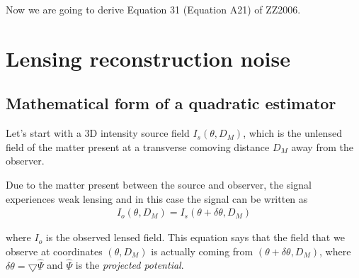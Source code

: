 \documentclass[12pt]{article}
\newcommand{\beqa}{\begin{eqnarray}}
\newcommand{\eeqa}{\end{eqnarray}}
\numberwithin{equation}{section}
\begin{document}
Now we are going to derive Equation 31 (Equation A21) of ZZ2006.

\section{Lensing reconstruction noise}
\subsection{Mathematical form of a quadratic estimator}
Let's start with a 3D intensity source field $I_s(\theta, D_M)$, which is the unlensed field of the matter present at a transverse comoving distance $D_M$ away from the observer. 

Due to the matter present between the source and observer, the signal experiences weak lensing and in this case the signal can be written as
\beqa
I_o(\theta,D_M) = I_s(\theta + \delta\theta, D_M )
\eeqa

where $I_o$ is the observed lensed field. This equation says that the field that we observe at coordinates $(\theta,D_M)$ is actually coming from $(\theta + \delta\theta, D_M)$, where $\delta\theta = \bigtriangledown\hat{\Psi}$ and $\hat{\Psi}$ is the \textit{projected potential}. 
\end{document}
